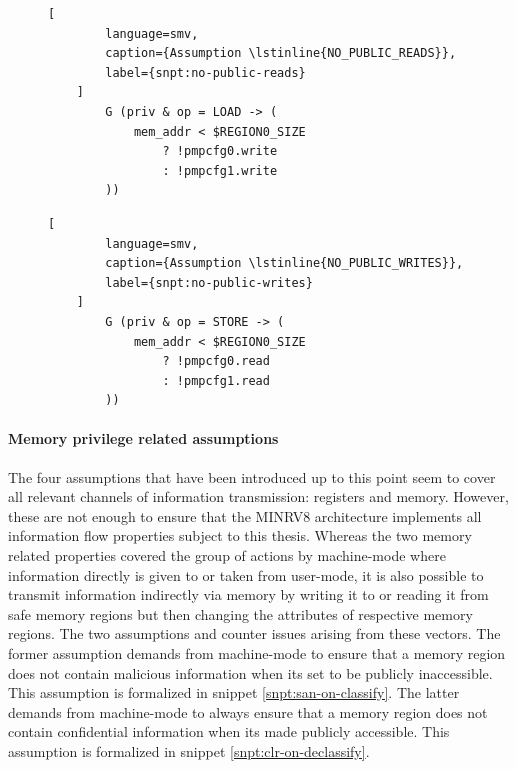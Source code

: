 \begin{figure}
    \begin{lstlisting}[
        language=smv,
        caption={Assumption \lstinline{NO_PUBLIC_READS}},
        label={snpt:no-public-reads}
    ]
        G (priv & op = LOAD -> (
            mem_addr < $REGION0_SIZE
                ? !pmpcfg0.write
                : !pmpcfg1.write
        ))
    \end{lstlisting}

    \begin{lstlisting}[
        language=smv,
        caption={Assumption \lstinline{NO_PUBLIC_WRITES}},
        label={snpt:no-public-writes}
    ]
        G (priv & op = STORE -> (
            mem_addr < $REGION0_SIZE
                ? !pmpcfg0.read
                : !pmpcfg1.read
        ))
    \end{lstlisting}
\end{figure}

\paragraph{Memory privilege related assumptions}
The four assumptions that have been introduced up to this point seem to cover all relevant channels of information transmission: registers and memory.
However, these are not enough to ensure that the MINRV8 architecture implements all information flow properties subject to this thesis.
Whereas the two memory related properties covered the group of actions by machine-mode where information directly is given to or taken from user-mode, it is also possible to transmit information indirectly via memory by writing it to or reading it from safe memory regions but then changing the attributes of respective memory regions.
The two assumptions  and  counter issues arising from these vectors.
The former assumption demands from machine-mode to ensure that a memory region does not contain malicious information when its set to be publicly inaccessible.
This assumption is formalized in snippet \ref{snpt:san-on-classify}.
The latter demands from machine-mode to always ensure that a memory region does not contain confidential information when its made publicly accessible.
This assumption is formalized in snippet \ref{snpt:clr-on-declassify}.

